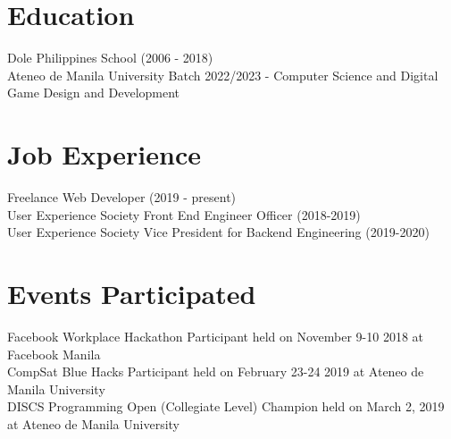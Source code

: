 \documentclass{article}
\begin{document}

    \section{Education}
    Dole Philippines School (2006 - 2018)\\
    Ateneo de Manila University Batch 2022/2023 - Computer Science and Digital Game Design and Development

    \section{Job Experience}
    Freelance Web Developer (2019 - present)\\
    User Experience Society Front End Engineer Officer (2018-2019)\\
    User Experience Society Vice President for Backend Engineering (2019-2020)

    \section{Events Participated}

    Facebook Workplace Hackathon Participant held on November 9-10 2018 at Facebook Manila\\
    CompSat Blue Hacks Participant held on February 23-24 2019 at Ateneo de Manila University\\
    DISCS Programming Open (Collegiate Level) Champion held on March 2, 2019 at Ateneo de Manila University

    
\end{document}
